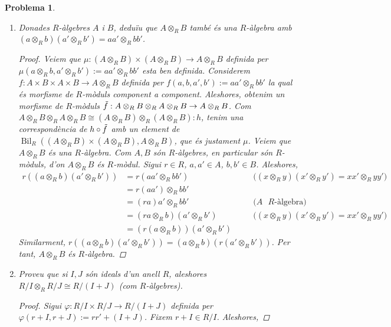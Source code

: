 \documentclass[compress]{article}
\newtheorem{problema}{Problema}
\theoremstyle{definition}
\DeclareMathOperator{\Bil}{Bil}
\begin{document}
\begin{problema}
    \begin{enumerate}
        \item Donades $R$-àlgebres $A$ i $B$, deduïu que $A\otimes_{R}B$ també és una $R$-àlgebra amb $(a\otimes_{R}b)(a'\otimes_{R}b')=aa'\otimes_{R}bb'$.
        \begin{proof}
            Veiem que $\mu:(A\otimes_{R}B)\times(A\otimes_{R}B)\rightarrow A\otimes_{R}B$ definida per $\mu(a\otimes_{R}b,a'\otimes_{R}b'):=aa'\otimes_{R}bb'$ esta ben definida. Considerem $f:A\times B\times A\times B\rightarrow A\otimes_{R}B$ definida per $f(a,b,a',b'):=aa'\otimes_{R}bb'$ la qual és morfisme de $R$-mòduls component a component. Aleshores, obtenim un morfisme de $R$-mòduls $\Tilde{f}:A\otimes_{R} B\otimes_{R} A\otimes_{R}B\rightarrow A\otimes_{R}B$. Com $A\otimes_{R}B\otimes_{R}A\otimes_{R} B\cong(A\otimes_{R}B)\otimes_{R}(A\otimes_{R}B):h$, tenim una correspondència de $h\circ\Tilde{f}$ amb un element de $\Bil_{R}((A\otimes_{R}B)\times(A\otimes_{R}B),A\otimes_{R}B)$, que és justament $\mu$.\newline
            Veiem que $A\otimes_{R}B$ és una $R$-àlgebra. Com $A,B$ són $R$-àlgebres, en particular són $R$-mòduls, d'on $A\otimes_{R}B$ és $R$-mòdul. Sigui $r\in R$, $a,a'\in A$, $b,b'\in B$. Aleshores,
            \begin{align*}
                r((a\otimes_{R}b)(a'\otimes_{R}b'))
                &=r(aa'\otimes_{R}bb')
                &\quad&\textrm{($(x\otimes_{R}y)(x'\otimes_{R}y')=xx'\otimes_{R}yy'$)}\\
                &=r(aa')\otimes_{R}bb'\\
                &=(ra)a'\otimes_{R}bb'
                &\quad&\textrm{($A$ $R$-àlgebra)}\\
                &=(ra\otimes_{R}b)(a'\otimes_{R}b')
                &\quad&\textrm{($(x\otimes_{R}y)(x'\otimes_{R}y')=xx'\otimes_{R}yy'$)}\\
                &=(r(a\otimes_{R}b))(a'\otimes_{R}b')
            \end{align*}
            Similarment, $r((a\otimes_{R}b)(a'\otimes_{R}b'))=(a\otimes_{R}b)(r(a'\otimes_{R}b'))$. Per tant, $A\otimes_{R}B$ és $R$-àlgebra.
        \end{proof}
        \item Proveu que si $I,J$ són ideals d'un anell $R$, aleshores $R/I\otimes_{R}R/J\cong R/(I + J)$ (com $R$-àlgebres).
        \begin{proof}
            Sigui $\varphi:R/I\times R/J\rightarrow R/(I+J)$ definida per $\varphi(r+I,r+J):=rr'+(I+J)$. Fixem $r+I\in R/I$. Aleshores,

\end{proof}
\end{enumerate}
\end{problema}
\end{document}
